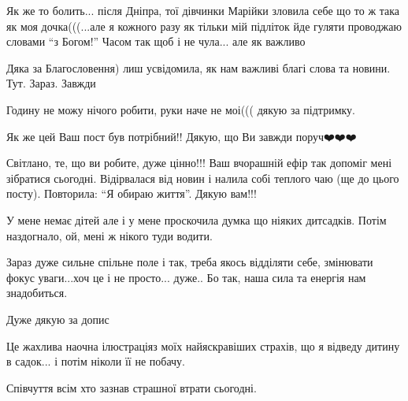\begin{itemize}

Як же то болить... після Дніпра, тої дівчинки Марійки зловила себе що то ж така
як моя дочка(((...але я кожного разу як тільки мій підліток йде гуляти
проводжаю словами \enquote{з Богом!} Часом так щоб і не чула... але як важливо


Дяка за Благословення) лиш усвідомила, як нам важливі благі слова та новини. Тут. Зараз. Завжди


Годину не можу нічого робити, руки наче не моі((( дякую за підтримку.



Як же цей Ваш пост був потрібний!! Дякую, що Ви завжди поруч❤️❤️❤️


Світлано, те, що ви робите, дуже цінно!!! Ваш вчорашній ефір так допоміг мені
зібратися сьогодні. Відірвалася від новин і налила собі теплого чаю (ще до
цього посту). Повторила: \enquote{Я обираю життя}. Дякую вам!!!


У мене немає дітей але і у мене проскочила думка що ніяких дитсадків. Потім
наздогнало, ой, мені ж нікого туди водити.

Зараз дуже сильне спільне поле і так, треба якось відділяти себе, змінювати
фокус уваги...хоч це і не просто... дуже.. Бо так, наша сила та енергія нам
знадобиться.

Дуже дякую за допис


Це жахлива наочна ілюстраціяз моїх найяскравіших страхів, що я відведу дитину в
садок... і потім ніколи її не побачу.

Співчуття всім хто зазнав страшної втрати сьогодні.


\end{itemize} %
